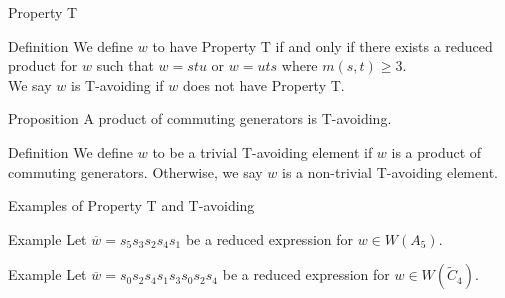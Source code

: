 \documentclass[9pt,handout]{beamer}
\newcommand{\w}{\overline{w}}
\newcommand{\C}{\widetilde{C}}
\newcommand\heapblock[4]{\fill[fill=#4, fill opacity=0.35, draw=#4, line width=1.1pt, rounded corners,shift={(\xxaxis:#1)},shift={(\yyaxis:#2)}] (-1,-1) rectangle (1,1);\node at (#1,#2) {\footnotesize $#3$};}
\newcommand\xxaxis{0}
\newcommand\yyaxis{90}
\begin{document}

\begin{frame}{Property T}
	\begin{block}{Definition}
	We define $w$ to have \alert{Property T} if and only if there exists a reduced product for $w$ such that $w=stu$ or $w=uts$ where $m(s,t) \geq 3$.\\ \pause 
	\vspace{1em}
	We say $w$ is \alert{T-avoiding} if $w$ does not have Property T.
	\end{block}
\pause
\begin{block}{Proposition}
A product of commuting generators is T-avoiding.	
\end{block}
\pause
\begin{block}{Definition}
	We define $w$ to be a \alert{trivial T-avoiding} element if $w$ is a product of commuting generators. Otherwise, we say $w$ is a \alert{non-trivial T-avoiding} element.
\end{block}

\end{frame}




\begin{frame}{Examples of Property T and T-avoiding}

\begin{block}{Example}
Let $\w=s_5s_3s_2s_4s_1$ be a reduced expression for $w \in W(A_5)$. 
\pause
\begin{figure}
\end{figure}
\end{block}

\pause

\begin{block}{Example}
Let $\w=s_0s_2s_4s_1s_3s_0s_2s_4$ be a reduced expression for $w \in W(\C_4)$.
\begin{figure}
\end{figure}
\end{block}

\end{frame}
\end{document}
